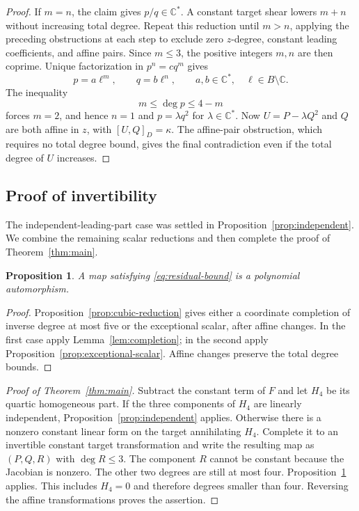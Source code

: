 \documentclass[11pt,reqno]{amsart}
\numberwithin{equation}{section}
\theoremstyle{plain}
\newtheorem{proposition}[theorem]{Proposition}
\theoremstyle{definition}
\theoremstyle{remark}
\newcommand{\C}{\mathbb C}
\begin{document}
\begin{proof}
If $m=n$, the claim gives $p/q\in\C^*$.
A constant target shear lowers $m+n$ without increasing total degree.
Repeat this reduction until $m>n$, applying the preceding obstructions at each step to exclude zero $z$-degree, constant leading coefficients, and affine pairs.
Since $m\le3$, the positive integers $m,n$ are then coprime.
Unique factorization in $p^n=cq^m$ gives
\[
p=a\ell^m,\qquad q=b\ell^n,\qquad
a,b\in\C^*,\quad \ell\in B\setminus\C.
\]
The inequality
\[
m\le\deg p\le4-m
\]
forces $m=2$, and hence $n=1$ and $p=\lambda q^2$ for $\lambda\in\C^*$.
Now $U=P-\lambda Q^2$ and $Q$ are both affine in $z$, with $[U,Q]_D=\kappa$.
The affine-pair obstruction, which requires no total degree bound, gives
the final contradiction even if the total degree of $U$ increases.
\end{proof}

\subsection{Proof of invertibility}\label{sec:assembly}
The independent-leading-part case was settled in
Proposition~\ref{prop:independent}. We combine the remaining scalar
reductions and then complete the proof of Theorem~\ref{thm:main}.
\begin{proposition}\label{prop:low-component}
A map satisfying \eqref{eq:residual-bound} is a polynomial automorphism.
\end{proposition}
\begin{proof}
Proposition~\ref{prop:cubic-reduction} gives either a coordinate completion of inverse degree at most five or the exceptional scalar, after affine changes. In the first case apply Lemma~\ref{lem:completion}; in the second apply Proposition~\ref{prop:exceptional-scalar}. Affine changes preserve the total degree bounds.
\end{proof}

\begin{proof}[Proof of Theorem~\ref{thm:main}]
Subtract the constant term of $F$ and let $H_4$ be its quartic homogeneous part. If the three components of $H_4$ are linearly independent, Proposition~\ref{prop:independent} applies. Otherwise there is a nonzero constant linear form on the target annihilating $H_4$. Complete it to an invertible constant target transformation and write the resulting map as $(P,Q,R)$ with $\deg R\le3$. The component $R$ cannot be constant because the Jacobian is nonzero. The other two degrees are still at most four. Proposition~\ref{prop:low-component} applies. This includes $H_4=0$ and therefore degrees smaller than four. Reversing the affine transformations proves the assertion.
\end{proof}
\end{document}
